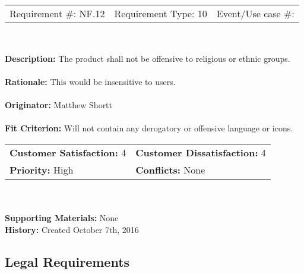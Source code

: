 \documentclass[12pt, titlepage]{article}
\begin{document}
\begin{framed}
	
	\begin{center}
		
		\begin{tabular}{ l c r }
			Requirement \#: NF.12 & Requirement Type: 10 & Event/Use case \#: \\
		\end{tabular} \\
	\end{center}
	\textbf{Description:} The product shall not be offensive to religious or ethnic groups.\\
	\\
	\textbf{Rationale:} This would be insensitive to users.  \\
	\\
	\textbf{Originator:} Matthew Shortt \\
	\\
	\textbf{Fit Criterion:} Will not contain any derogatory or offensive language or icons. 
	\\
	
	\begin{tabular}{ll}
		\textbf{Customer Satisfaction:} 4 & \textbf{Customer Dissatisfaction:} 4 \\
		\textbf{Priority:} High & \textbf{Conflicts:} None\\
	\end{tabular} \\
	\\
	\textbf{Supporting Materials:} None \\
	\textbf{History:} Created October 7th, 2016
	
\end{framed}

\subsection{Legal Requirements}
\end{document}
